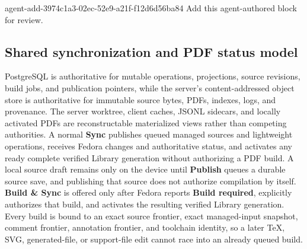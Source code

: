 \agentProposedEdit
  {agent-add-3974c1a3-02ec-52e9-a21f-f12d6d56ba84}
  {Add this agent-authored block for review.}
  {}
  {\subsection*{Shared synchronization and PDF status model}
PostgreSQL is authoritative for mutable operations, projections, source revisions, build jobs, and publication pointers, while the server's content-addressed object store is authoritative for immutable source bytes, PDFs, indexes, logs, and provenance.
The server worktree, client caches, JSONL sidecars, and locally activated PDFs are reconstructable materialized views rather than competing authorities.
A normal \textbf{Sync} publishes queued managed sources and lightweight operations, receives Fedora changes and authoritative status, and activates any ready complete verified Library generation without authorizing a PDF build.
A local source draft remains only on the device until \textbf{Publish} queues a durable source save, and publishing that source does not authorize compilation by itself.
\textbf{Build \& Sync} is offered only after Fedora reports \textbf{Build required}, explicitly authorizes that build, and activates the resulting verified Library generation.
Every build is bound to an exact source frontier, exact managed-input snapshot, comment frontier, annotation frontier, and toolchain identity, so a later TeX, SVG, generated-file, or support-file edit cannot race into an already queued build.
}

